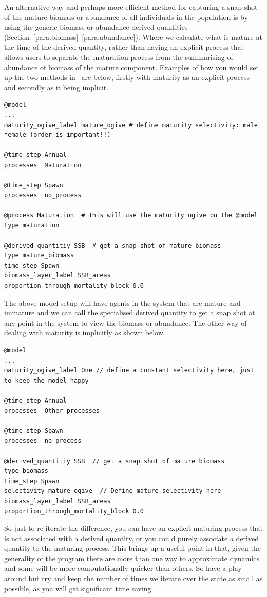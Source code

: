An alternative way and perhaps more efficient method for capturing a snap shot of the mature biomass or abundance of all individuals in the population is by using the generic biomass or abundance derived quantities (Section~\ref{para:biomass}~\ref{para:abundance}). Where we calculate what is mature at the time of the derived quantity, rather than having an explicit process that allows users to separate the maturation process from the summarising of abundance of biomass of the mature component. Examples of how you would set up the two methods in \IBM\ are below, firstly with maturity as an explicit process and secondly as it being implicit.

{\small{\begin{verbatim}
@model
...
maturity_ogive_label mature_ogive # define maturity selectivity: male female (order is important!!)

@time_step Annual
processes  Maturation 

@time_step Spawn
processes  no_process 

@process Maturation  # This will use the maturity ogive on the @model
type maturation

@derived_quantitiy SSB  # get a snap shot of mature biomass
type mature_biomass
time_step Spawn
biomass_layer_label SSB_areas
proportion_through_mortality_block 0.0
\end{verbatim}}}

The above model setup will have agents in the system that are mature and immature and we can call the specialised  derived quantity to get a snap shot at any point in the system to view the biomass or abundance. The other way of dealing with maturity is implicitly as shown below.

{\small{\begin{verbatim}
@model
...
maturity_ogive_label One // define a constant selectivity here, just to keep the model happy

@time_step Annual
processes  Other_processes

@time_step Spawn
processes  no_process 	
	
@derived_quantitiy SSB  // get a snap shot of mature biomass
type biomass
time_step Spawn
selectivity mature_ogive  // Define mature selectivity here
biomass_layer_label SSB_areas
proportion_through_mortality_block 0.0
\end{verbatim}}}

So just to re-iterate the difference, you can have an explicit maturing process that is not associated with a derived quantity, or you could purely associate a derived quantity to the maturing process. This brings up a useful point in that, given the generality of the program there are more than one way to approximate dynamics and some will be more computationally quicker than others. So have a play around but try and keep the number of times we iterate over the state as small as possible, as you will get significant time saving.



